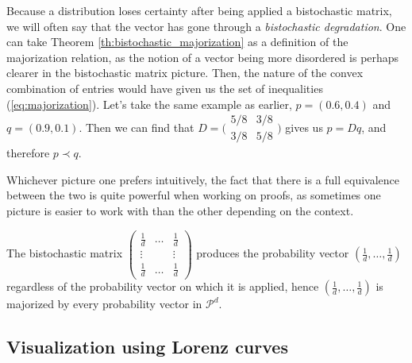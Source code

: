 Because a distribution loses certainty after being applied a bistochastic matrix, we will often say that the vector has gone through a \textit{bistochastic degradation}. One can take Theorem \ref{th:bistochastic_majorization} as a definition of the majorization relation, as the notion of a vector being more disordered is perhaps clearer in the bistochastic matrix picture. Then, the nature of the convex combination %
of entries would have given us the set of inequalities (\ref{eq:majorization}). Let's take the same example as earlier, $p = (0.6, 0.4)$ and $q = (0.9, 0.1)$. Then we can find that $D = \Big(\begin{smallmatrix}
                                                                                                    5/8 & 3/8 \\
                                                                                                    3/8 & 5/8
                                                                                                \end{smallmatrix}\Big)$
gives us $p = Dq$, and therefore $p \prec q$.

Whichever picture one prefers intuitively, the fact that there is a full equivalence between the two is quite powerful when working on proofs, as sometimes one picture is easier to work with than the other depending on the context.

\begin{remark}
    The bistochastic matrix $\begin{pmatrix} \frac{1}{d} & \dots & \frac{1}{d} \\
                                                      \vdots & & \vdots \\
                                                      \frac{1}{d} & \dots & \frac{1}{d}
                             \end{pmatrix}$ 
    produces the probability vector $(\frac{1}{d}, \dots, \frac{1}{d})$ regardless of the probability vector on which it is applied, hence $(\frac{1}{d}, \dots, \frac{1}{d})$ is majorized by every probability vector in $\mathcal{P}^d$.
\end{remark}



\subsection{Visualization using Lorenz curves}

